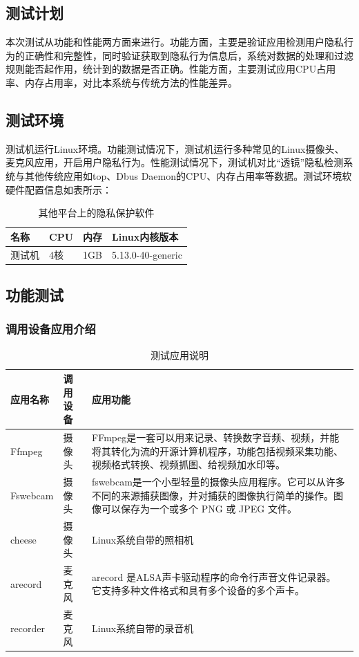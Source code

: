 \documentclass[12pt,a4paper]{ctexart}
\begin{document}
\subsection{测试计划}
本次测试从功能和性能两方面来进行。功能方面，主要是验证应用检测用户隐私行为的正确性和完整性，同时验证获取到隐私行为信息后，系统对数据的处理和过滤规则能否起作用，统计到的数据是否正确。性能方面，主要测试应用CPU占用率、内存占用率，对比本系统与传统方法的性能差异。
\subsection{测试环境}
测试机运行Linux环境。功能测试情况下，测试机运行多种常见的Linux摄像头、麦克风应用，开启用户隐私行为。性能测试情况下，测试机对比“透镜”隐私检测系统与其他传统应用如top、Dbus Daemon的CPU、内存占用率等数据。测试环境软硬件配置信息如表所示：

\begin{table}
\begin{tabular}{|l|l|l|l|}
  \hline
  \rowcolor{blue!50} 名称&CPU&内存&Linux内核版本\\
  \hline
  测试机&4核&1GB&5.13.0-40-generic\\
  \hline
\end{tabular}
\caption{其他平台上的隐私保护软件}
\end{table}

\subsection{功能测试}
\subsubsection{调用设备应用介绍}
\begin{table}
\begin{tabular}{|p{3cm}|p{3cm}|p{6cm}|}
  \hline
  \rowcolor{blue!50}应用名称&调用设备&应用功能\\
  \hline
Ffmpeg&摄像头&FFmpeg是一套可以用来记录、转换数字音频、视频，并能将其转化为流的开源计算机程序，功能包括视频采集功能、视频格式转换、视频抓图、给视频加水印等。\\
\hline
Fswebcam&摄像头&fswebcam是一个小型轻量的摄像头应用程序。它可以从许多不同的来源捕获图像，并对捕获的图像执行简单的操作。图像可以保存为一个或多个 PNG 或 JPEG 文件。\\
\hline
cheese&摄像头&Linux系统自带的照相机\\
\hline
arecord&麦克风&arecord 是ALSA声卡驱动程序的命令行声音文件记录器。 它支持多种文件格式和具有多个设备的多个声卡。\\
\hline
recorder&麦克风&Linux系统自带的录音机\\
\hline
\end{tabular}
\caption{测试应用说明}
\end{table}
\end{document}
